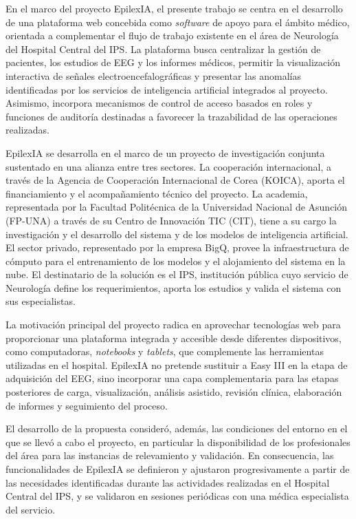 
En el marco del proyecto EpilexIA, el presente trabajo se centra en el desarrollo de una plataforma web concebida como \textit{software} de apoyo para el ámbito médico, orientada a complementar el flujo de trabajo existente en el área de Neurología del Hospital Central del IPS. La plataforma busca centralizar la gestión de pacientes, los estudios de EEG y los informes médicos, permitir la visualización interactiva de señales electroencefalográficas y presentar las anomalías identificadas por los servicios de inteligencia artificial integrados al proyecto. Asimismo, incorpora mecanismos de control de acceso basados en roles y funciones de auditoría destinadas a favorecer la trazabilidad de las operaciones realizadas.

EpilexIA se desarrolla en el marco de un proyecto de investigación conjunta sustentado en una alianza entre tres sectores.
La cooperación internacional, a través de la Agencia de Cooperación Internacional de Corea (KOICA), aporta el financiamiento y el acompañamiento técnico del proyecto.
La academia, representada por la Facultad Politécnica de la Universidad Nacional de Asunción (FP-UNA) a través de su Centro de Innovación TIC (CIT), tiene a su cargo la investigación y el desarrollo del sistema y de los modelos de inteligencia artificial.
El sector privado, representado por la empresa BigQ, provee la infraestructura de cómputo para el entrenamiento de los modelos y el alojamiento del sistema en la nube.
El destinatario de la solución es el IPS, institución pública cuyo servicio de Neurología define los requerimientos, aporta los estudios y valida el sistema con sus especialistas.

La motivación principal del proyecto radica en aprovechar tecnologías web para proporcionar una plataforma integrada y accesible desde diferentes dispositivos, como computadoras, \textit{notebooks} y \textit{tablets}, que complemente
 las herramientas utilizadas en el hospital. EpilexIA no pretende sustituir a Easy III en la etapa de adquisición del EEG, sino incorporar una capa complementaria para las etapas posteriores de carga, visualización, análisis asistido, revisión clínica, elaboración de informes y seguimiento del proceso.

El desarrollo de la propuesta consideró, además, las condiciones del
entorno en el que se llevó a cabo el proyecto, en particular la
disponibilidad de los profesionales del área para las instancias de
relevamiento y validación. En consecuencia, las funcionalidades de
EpilexIA se definieron y ajustaron progresivamente a partir de las
necesidades identificadas durante las actividades realizadas en el
Hospital Central del IPS, y se validaron en sesiones periódicas con una
médica especialista del servicio.


